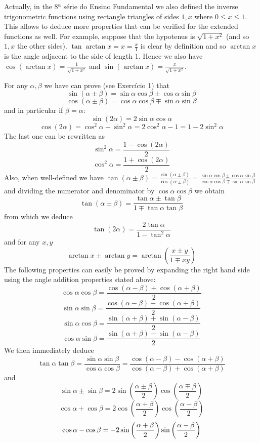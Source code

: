 Actually, in the 8ª série do Ensino Fundamental we also defined the inverse
trigonometric functions using rectangle triangles of sides $1, x$ where
$0 \leq x \leq 1$. This allows to deduce more properties that can be verified
for the extended functions as well.
For example, suppose that the hypotenus is
$\sqrt{1+x^2}$ (and so $1,x$ the other sides).
$\tan {\arctan x} = x = \frac{x}{1}$ is clear by definition and so
$\arctan x$ is the angle adjacent to the side of length $1$. Hence
we also have $\cos \left( \arctan x \right) =  \frac{1}{\sqrt{1+x^2}}$
and $\sin \left( \arctan x \right) =  \frac{x}{\sqrt{1+x^2}}$.

For any $\alpha, \beta$ we have can prove (see Exercício 1) that
$$
\sin\left(\alpha \pm \beta\right) =
{\sin \alpha \cos \beta} \pm {\cos \alpha \sin \beta}
$$
$$
\cos\left(\alpha \pm \beta\right) =
{\cos \alpha \cos \beta} \mp {\sin \alpha \sin \beta}
$$
and in particular if $\beta = \alpha$:
$$
\sin\left(2\alpha\right) =
2{\sin \alpha \cos \alpha}
$$
$$
\cos\left(2\alpha\right) =
         {\cos^2 \alpha} - {\sin^2 \alpha} =
         2{\cos^2 \alpha} - 1 = 1 - 2{\sin^2 \alpha}
$$
The last one can be rewritten as
$$
\sin^2 \alpha = \frac{1-\cos{(2\alpha)}}{2}
$$
$$
\cos^2 \alpha = \frac{1+\cos{(2\alpha)}}{2}
$$
Also, when well-defined we have
$\tan\left(\alpha \pm \beta\right) =
\frac{\sin\left(\alpha \pm \beta\right)}{\cos\left(\alpha \pm \beta\right)}=
\frac{{\sin \alpha \cos \beta} \pm {\cos \alpha \sin \beta}}
     {{\cos \alpha \cos \beta} \mp {\sin \alpha \sin \beta}}
     $ and dividing the numerator and denominator by
     ${\cos \alpha \cos \beta}$ we obtain
$$
\tan\left(\alpha \pm \beta\right) =
\frac{\tan \alpha \pm \tan \beta}{1 \mp {\tan \alpha \tan \beta}}
$$
from which we deduce
$$
\tan\left(2\alpha\right) =
\frac{2\tan \alpha}{1 - {\tan^2 \alpha}}
$$
and for any $x,y$
$$
\arctan{x} \pm \arctan{y} = \arctan \left(\frac{x\pm y}{1 \mp xy}\right)
$$
The following properties can easily be proved by expanding the
right hand side using the angle addition properties stated above:
$$
\cos \alpha \cos \beta =
\frac{\cos\left(\alpha - \beta\right) + \cos\left(\alpha + \beta\right)}{2}
$$
$$
\sin \alpha \sin \beta =
\frac{\cos\left(\alpha - \beta\right) - \cos\left(\alpha + \beta\right)}{2}
$$
$$
\sin \alpha \cos \beta =
\frac{\sin\left(\alpha + \beta\right) + \sin\left(\alpha - \beta\right)}{2}
$$
$$
\cos \alpha \sin \beta =
\frac{\sin\left(\alpha + \beta\right) - \sin\left(\alpha - \beta\right)}{2}
$$
We then immediately deduce
$$
\tan \alpha \tan \beta =
\frac{\sin \alpha \sin \beta}{\cos \alpha \cos \beta} =
\frac{\cos\left(\alpha - \beta\right) - \cos\left(\alpha + \beta\right)}
{\cos\left(\alpha - \beta\right) + \cos\left(\alpha + \beta\right)}$$
and
$$\sin \alpha \pm \sin \beta = 2 \sin\left( \frac{\alpha \pm \beta}{2} \right) \cos\left( \frac{\alpha \mp \beta}{2} \right)$$
$$\cos \alpha + \cos \beta = 2 \cos\left( \frac{\alpha + \beta} {2} \right) \cos\left( \frac{\alpha - \beta}{2} \right)$$
$$\cos \alpha - \cos \beta = -2\sin\left( {\alpha + \beta \over 2}\right) \sin\left({\alpha - \beta \over 2}\right)$$


